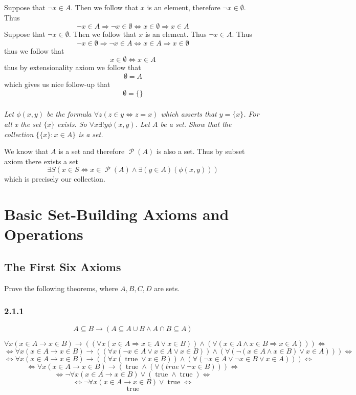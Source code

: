 \documentclass[11pt,oneside,titlepage]{book}
\DeclareMathOperator \pow {\mathcal {P}}
\DeclareMathOperator \lra {\Leftrightarrow}
\DeclareMathOperator \imp {\Rightarrow}
\DeclareMathOperator \true {true}
\begin{document}
Suppose that $\neg x \in A$. Then we follow that $x$ is an element, therefore $\neg x \in \emptyset$.
Thus
$$\neg x \in A \imp \neg x \in \emptyset \iff x \in \emptyset \imp x \in A$$
Suppose that $\neg x \in \emptyset$. Then we follow that $x$ is an element. Thus $\neg x \in A$.
Thus
$$\neg x \in \emptyset \imp \neg x \in A \iff x \in A \imp x \in  \emptyset$$
thus we follow that
$$x \in \emptyset \lra x \in A$$
thus by extensionality axiom we follow that
$$\emptyset = A$$
which gives us nice follow-up that
$$\emptyset = \{\}$$

\subsection{}

\textit{Let $\phi(x, y)$ be the formula $\forall z(z \in y \lra z = x)$ which asserts that
  $y = \{x\}$. For all x the set $\{x\}$ exists. So $\forall x  \exists! y \phi(x, y)$.
  Let $A$ be a set. Show that the collection $\{\{x\}: x \in A\}$ is a set.}

We know that $A$ is a set and therefore $\pow(A)$ is also a set. Thus by subset axiom
there exists a set 
$$\exists S (x \in S \lra x \in \pow(A) \land \exists(y \in A)(\phi(x, y)))$$
which is precisely our collection.

\chapter{Basic Set-Building Axioms and Operations}

\section{The First Six Axioms}

Prove the following theorems, where $A, B, C, D$ are sets.

\subsection*{2.1.1}

$$A \subseteq B \to (A \subseteq A \cup B \land A \cap B \subseteq A )$$

$$ \forall x (x \in A \to x \in B) \to ((\forall x (x \in A \imp x \in A \lor x \in B)) \land
(\forall (x \in A \land x \in B \imp x \in A))) \lra $$
$$ \lra
\forall x (x \in A \to x \in B) \to ((\forall x (\neg x \in A \lor x \in A \lor x \in B)) \land
(\forall (\neg (x \in A \land x \in B) \lor x \in A))) \lra $$
$$ \lra \forall x (x \in A \to x \in B) \to ((\forall x ( \true  \lor x \in B)) \land
(\forall ( \neg x \in A \lor \neg x \in B \lor x \in A))) \lra $$
$$ \lra \forall x (x \in A \to x \in B) \to (\true \land
(\forall ( true \lor \neg x \in B))) \lra $$
$$ \lra \neg \forall x (x \in A \to x \in B) \lor (\true \land \true) \lra $$
$$ \lra \neg \forall x (x \in A \to x \in B) \lor \true \lra $$
$$\true$$
\end{document}
